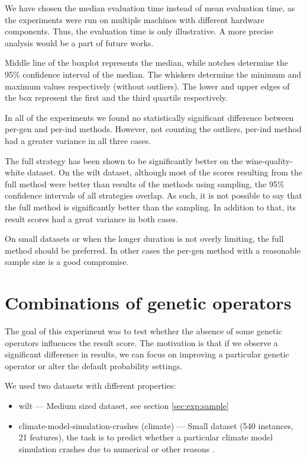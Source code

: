 We have chosen the median evaluation time instead of mean evaluation time,
as the experiments were run on multiple machines with different hardware
components. Thus, the evaluation time is only illustrative. A more precise
analysis would be a part of future works.

Middle line of the boxplot represents the median, while notches determine the
95\% confidence interval of the median. The whiskers determine the minimum and
maximum values respectively (without outliers). The lower and upper edges of
the box represent the first and the third quartile respectively.

In all of the experiments we found no statistically significant difference
between per-gen and per-ind methods. However, not counting
the outliers, per-ind method had a greater variance in all three cases.

The full strategy has been shown to be significantly better on the
wine-quality-white dataset. On the wilt dataset, although most of the scores
resulting from the full method were better than results of the methods
using sampling, the 95\% confidence intervals of all strategies overlap. As
such, it is not possible to say that the full method is significantly
better than the sampling. In addition to that, its result scores had a great
variance in both cases.

On small datasets or when the longer duration is not overly limiting, the full
method should be preferred. In other cases the per-gen method with a reasonable
sample size is a good compromise.


\section{Combinations of genetic operators} \label{sec:exp:genop}
The goal of this experiment was to test whether the absence of some genetic
operators influences the result score. The motivation is that if we observe a
significant difference in results, we can focus on improving a particular
genetic operator or alter the default probability settings.

We used two datasets with different properties:
\begin{itemize}
\item wilt --- Medium sized dataset, see section \ref{sec:exp:sample}
\item climate-model-simulation-crashes (climate) --- Small dataset (540
instances, 21 features), the task is to predict whether a particular
climate model simulation crashes due to numerical or other reasons
\citep{gmd-6-1157-2013}.
\end{itemize}

